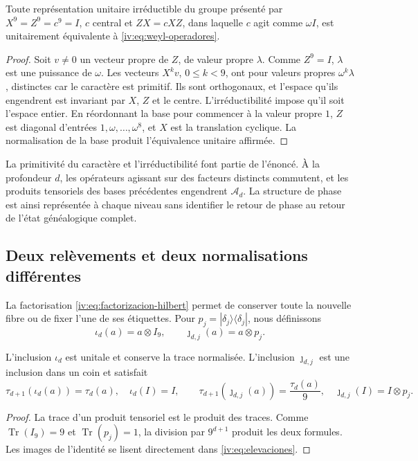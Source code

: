 \begin{theorem}
\label{iv:thm:weyl-unicidad}
Toute représentation unitaire irréductible du groupe présenté par
\(X^9=Z^9=c^9=I\), \(c\) central et \(ZX=cXZ\), dans laquelle
\(c\) agit comme \(\omega I\), est unitairement équivalente à
\eqref{iv:eq:weyl-operadores}.
\end{theorem}
\begin{proof}
Soit \(v\neq0\) un vecteur propre de \(Z\), de valeur propre \(\lambda\). Comme \(Z^9=I\), \(\lambda\) est une puissance de \(\omega\). Les vecteurs \(X^kv\), \(0\leq k<9\), ont pour valeurs propres \(\omega^k\lambda\), distinctes car le caractère est primitif. Ils sont orthogonaux, et l'espace qu'ils engendrent est invariant par \(X\), \(Z\) et le centre. L'irréductibilité impose qu'il soit l'espace entier. En réordonnant la base pour commencer à la valeur propre \(1\), \(Z\) est diagonal d'entrées \(1,\omega,\ldots,\omega^8\), et \(X\) est la translation cyclique. La normalisation de la base produit l'équivalence unitaire affirmée.
\end{proof}

La primitivité du caractère et l’irréductibilité font partie de
l’énoncé. À la profondeur \(d\), les opérateurs agissant sur des facteurs
distincts commutent, et les produits tensoriels des bases précédentes
engendrent \(\mathcal A_d\). La structure de phase est ainsi
représentée à chaque niveau sans identifier le retour de phase au
retour de l’état généalogique complet.

\subsection{Deux relèvements et deux normalisations différentes}

La factorisation \eqref{iv:eq:factorizacion-hilbert} permet de conserver
toute la nouvelle fibre ou de fixer l’une de ses étiquettes. Pour
\(p_j=|\delta_j\rangle\langle\delta_j|\), nous définissons
\begin{equation}
 \iota_d(a)=a\otimes I_9,
 \qquad \jmath_{d,j}(a)=a\otimes p_j.
 \label{iv:eq:elevaciones}
\end{equation}
\begin{proposition}
\label{iv:prop:unidad-traza}
L’inclusion \(\iota_d\) est unitale et conserve la trace normalisée.
L’inclusion \(\jmath_{d,j}\) est une inclusion dans un coin et
satisfait
\[
 \tau_{d+1}(\iota_d(a))=\tau_d(a),\quad \iota_d(I)=I,
 \qquad
 \tau_{d+1}(\jmath_{d,j}(a))=\frac{\tau_d(a)}9,
 \quad \jmath_{d,j}(I)=I\otimes p_j.
\]
\end{proposition}
\begin{proof}
La trace d’un produit tensoriel est le produit des traces.
Comme \(\operatorname{Tr}(I_9)=9\) et
\(\operatorname{Tr}(p_j)=1\), la division par \(9^{d+1}\)
produit les deux formules. Les images de l’identité se lisent
directement dans \eqref{iv:eq:elevaciones}.
\end{proof}

